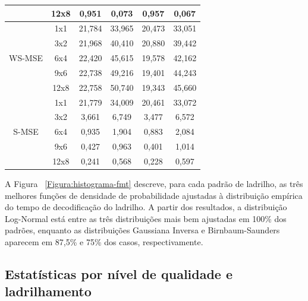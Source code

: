 \begin{longtable}{|c|c|c|c|c|c|}
                            & 12x8 & 0,951     & 0,073      & 0,957     & 0,067    \\  \hline 
    \multirow{5}{*}{WS-MSE}& 1x1  & 21,784    & 33,965     & 20,473    & 33,051   \\  \cline{2-6}
                            & 3x2  & 21,968    & 40,410     & 20,880    & 39,442   \\  \cline{2-6}
                            & 6x4  & 22,420    & 45,615     & 19,578    & 42,162   \\  \cline{2-6}           
                            & 9x6  & 22,738    & 49,216     & 19,401    & 44,243   \\  \cline{2-6}                
                            & 12x8 & 22,758    & 50,740     & 19,343    & 45,660   \\  \hline 
    \multirow{5}{*}{S-MSE}  & 1x1  & 21,779    & 34,009     & 20,461    & 33,072   \\  \cline{2-6}
                            & 3x2  & 3,661     & 6,749      & 3,477     & 6,572    \\  \cline{2-6}
                            & 6x4  & 0,935     & 1,904      & 0,883     & 2,084    \\  \cline{2-6}
                            & 9x6  & 0,427     & 0,963      & 0,401     & 1,014    \\  \cline{2-6}
                            & 12x8 & 0,241     & 0,568      & 0,228     & 0,597 
\end{longtable}

A Figura ~\ref{Figura:histograma-fmt} descreve, para cada padrão de ladrilho, as três melhores funções de densidade de probabilidade ajustadas à distribuição empírica do tempo de decodificação do ladrilho. A partir dos resultados, a distribuição Log-Normal está entre as três distribuições mais bem ajustadas em 100\% dos padrões, enquanto as distribuições Gaussiana Inversa e Birnbaum-Saunders aparecem em 87,5\% e 75\% dos casos, respectivamente.


\subsection{Estatísticas por nível de qualidade e ladrilhamento}

